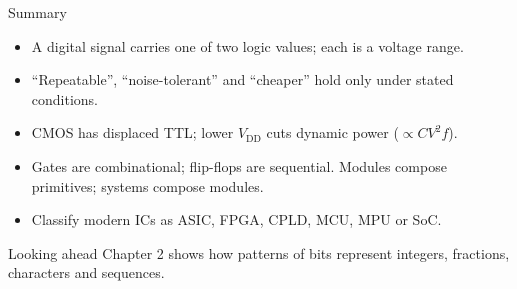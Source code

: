 \documentclass[9pt,aspectratio=169,xcolor=table]{beamer}
\begin{document}
\begin{frame}{Summary}
  \begin{itemize}\itemsep3pt
    \item A digital signal carries one of two logic values; each is a voltage \alert{range}.
    \item ``Repeatable'', ``noise-tolerant'' and ``cheaper'' hold only under stated conditions.
    \item CMOS has displaced TTL; lower $V_\mathrm{DD}$ cuts dynamic power ($\propto CV^2 f$).
    \item Gates are combinational; flip-flops are sequential. Modules compose primitives; systems compose modules.
    \item Classify modern ICs as ASIC, FPGA, CPLD, MCU, MPU or SoC.
  \end{itemize}
  \begin{block}{Looking ahead}
    Chapter 2 shows how patterns of bits represent integers, fractions, characters and sequences.
  \end{block}
\end{frame}
\end{document}
